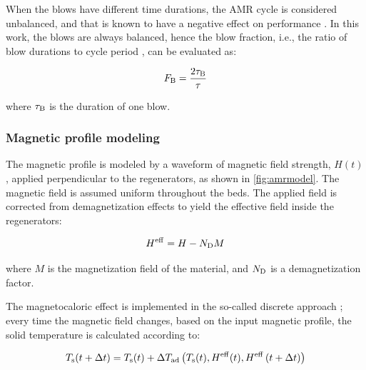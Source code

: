 \documentclass[referee]{svjour3}
\begin{document}
When the blows have different time durations, the AMR cycle is considered unbalanced, and that is known to have a negative effect on performance \cite{bib:eriksen16_effec,bib:nakashima18-influen-exp}. In this work, the blows are always balanced, hence the blow fraction, i.e., the ratio of blow durations to cycle period \cite{bib:nakashima18-influen-exp}, can be evaluated as:

\begin{equation}
\label{eq:59}
F_{\mathrm{B}} = \frac{2\tau_{\mathrm{B}}}{\tau}
\end{equation}

\noindent where $\tau_{\mathrm{B}}$ is the duration of one blow.


\subsubsection{Magnetic profile modeling}
\label{sec:how-magnetic-profile}

The magnetic profile is modeled by a waveform of magnetic field strength, $H(t)$, applied perpendicular to the regenerators, as shown in \autoref{fig:amrmodel}. The magnetic field is assumed uniform throughout the beds. The applied field is corrected from demagnetization effects to yield the effective field inside the regenerators:

\begin{equation}
  \label{eq:6}
  H^{\mathrm{eff}} = H - N_{\mathrm{D}} M
\end{equation}


\noindent where $M$ is the magnetization field of the material, and $N_{\mathrm{D}}$ is a demagnetization factor.

The magnetocaloric effect is implemented in the so-called discrete approach \cite{bib:nielsen11_review}; every time the magnetic field changes, based on the input magnetic profile, the solid temperature is calculated according to:

\begin{equation}
  \label{eq:89}
  T_{\mathrm{s}}(t + \Delta{}t) = T_{\mathrm{s}}(t) + \Delta{}T_{\mathrm{ad}} \left(T_{\mathrm{s}}(t),H^{\mathrm{eff}}(t),H^{\mathrm{eff}}\left(t + \Delta{}t\right)\right)
\end{equation}
\end{document}

